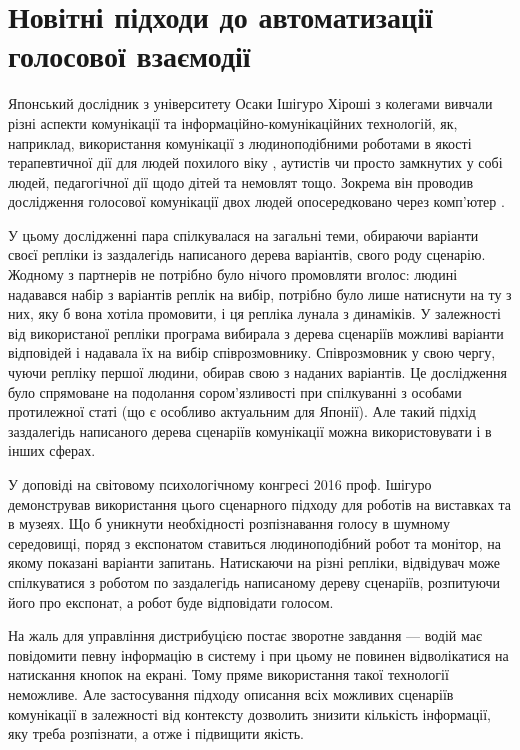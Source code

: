 \section{Новітні підходи до автоматизації голосової взаємодії} \label{sect1_5}

Японський дослідник з університету Осаки Ішігуро Хіроші з колегами вивчали різні аспекти комунікації та інформаційно-комунікаційних технологій, як, наприклад, використання комунікації з людиноподібними роботами в якості терапевтичної дії для людей похилого віку \cite{Nishio_2015}, аутистів \cite{Kumazaki_2016} чи просто замкнутих у собі людей, педагогічної дії щодо дітей та немовлят \cite{Park_2015} тощо. Зокрема він проводив дослідження голосової комунікації двох людей опосередковано через комп’ютер \cite{Ishiguro_2016}. 

У цьому дослідженні пара спілкувалася на загальні теми, обираючи варіанти своєї репліки із заздалегідь написаного дерева варіантів, свого роду сценарію. Жодному з партнерів не потрібно було нічого промовляти вголос: людині надавався набір з варіантів реплік на вибір, потрібно було лише натиснути на ту з них, яку б вона хотіла  промовити, і ця репліка лунала з динаміків. У залежності від використаної репліки програма вибирала з дерева сценаріїв можливі варіанти відповідей і надавала їх на вибір співрозмовнику. Співрозмовник у свою чергу, чуючи репліку першої людини, обирав свою з наданих варіантів. Це дослідження було спрямоване на подолання сором’язливості при спілкуванні з особами протилежної статі (що є особливо актуальним для Японії). Але такий підхід заздалегідь написаного дерева сценаріїв комунікації можна використовувати і в інших сферах.

У доповіді на світовому психологічному конгресі 2016 проф. Ішігуро демонстрував використання цього сценарного підходу для роботів на виставках та в музеях. Що б уникнути необхідності розпізнавання голосу в шумному середовищі, поряд з експонатом ставиться людиноподібний робот та монітор, на якому показані варіанти запитань. Натискаючи на різні репліки, відвідувач може спілкуватися з роботом по заздалегідь написаному дереву сценаріїв, розпитуючи його про експонат, а робот буде відповідати голосом.

На жаль для управління дистрибуцією постає зворотне завдання — водій має повідомити певну інформацію в систему і при цьому не повинен відволікатися на натискання кнопок на екрані. Тому пряме використання такої технології неможливе. Але застосування підходу описання всіх можливих сценаріїв комунікації в залежності від контексту дозволить знизити кількість інформації, яку треба розпізнати, а отже і підвищити якість.

